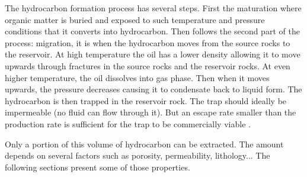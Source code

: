 The hydrocarbon formation process has several steps. First the maturation where organic matter is buried and exposed to such temperature and pressure conditions that it converts into hydrocarbon.  Then follows the second part of the process: migration, it is when the hydrocarbon moves from the source rocks to the reservoir. At high temperature the oil has a lower density allowing it to move upwards through fractures in the source rocks and the reservoir rocks. At even higher temperature, the oil dissolves into gas phase. Then when it moves upwards, the pressure decreases causing it to condensate back to liquid form. The hydrocarbon is then trapped in the reservoir rock. The trap should ideally be impermeable (no fluid can flow through it). But an escape rate smaller than the production rate is sufficient for the trap to be commercially viable \cite{oilbegin}. 

Only a portion of this volume of hydrocarbon can be extracted. The amount depends on several factors such as porosity, permeability, lithology...  The following sections present some of those properties. 
